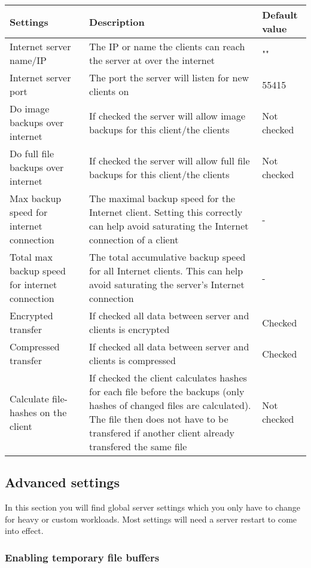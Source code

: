 \documentclass[a4paper,10pt]{article}
\begin{document}
\begin{tabular}{|p{}|p{}|p{}|}
\hline
Settings  & Description & Default value\\
\hline\hline
Internet server name/IP & The IP or name the clients can reach the server at over the internet & ""\\
\hline
Internet server port & The port the server will listen for new clients on & 55415 \\
\hline
Do image backups over internet & If checked the server will allow image backups for this client/the clients & Not checked \\
\hline
Do full file backups over internet & If checked the server will allow full file backups for this client/the clients & Not checked \\
\hline
Max backup speed for internet connection & The maximal backup speed for the Internet client. Setting this correctly can help avoid saturating the Internet connection of a client & - \\
\hline
Total max backup speed for internet connection & The total accumulative backup speed for all Internet clients. This can help avoid saturating the server's Internet connection & - \\
\hline
Encrypted transfer & If checked all data between server and clients is encrypted & Checked \\
\hline
Compressed transfer & If checked all data between server and clients is compressed & Checked \\
\hline
Calculate file-hashes on the client & If checked the client calculates hashes for each file before the backups (only hashes of changed files are calculated).
The file then does not have to be transfered if another client already transfered the same file & Not checked \\
\hline
\end{tabular}

\subsection{Advanced settings}

In this section you will find global server settings which you only have to
change for heavy or custom workloads. Most settings will need a server restart
to come into effect.

\subsubsection{Enabling temporary file buffers}
\label{temp_file_buffers}
\end{document}

